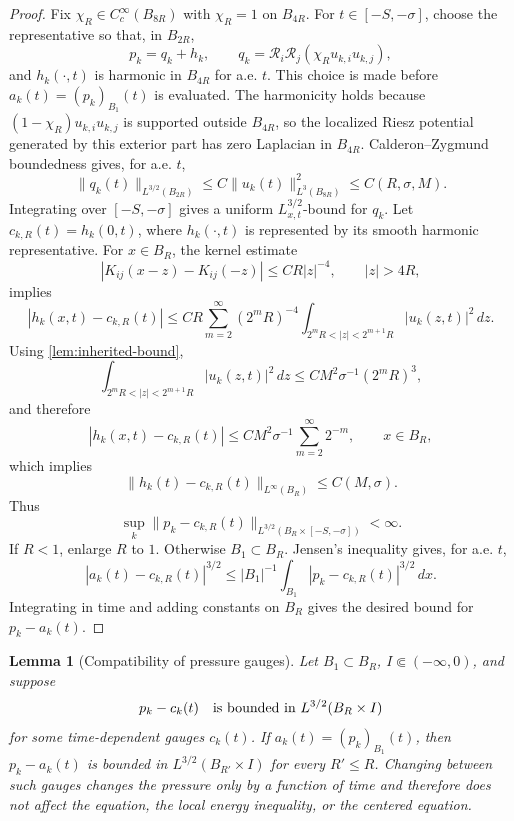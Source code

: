 \documentclass[11pt]{amsart}
\theoremstyle{plain}
\newtheorem{lemma}[theorem]{Lemma}
\theoremstyle{definition}
\theoremstyle{remark}
\numberwithin{equation}{section}
\begin{document}
\begin{proof}
Fix \(\chi_R\in C_c^\infty(B_{8R})\) with \(\chi_R=1\) on \(B_{4R}\).  For
\(t\in[-S,-\sigma]\), choose the representative so that, in \(B_{2R}\),
\[
   p_k=q_k+h_k,\qquad
   q_k=\mathcal R_i\mathcal R_j(\chi_Ru_{k,i}u_{k,j}),
\]
and \(h_k(\cdot,t)\) is harmonic in \(B_{4R}\) for a.e. \(t\).  This choice
is made before \(a_k(t)=(p_k)_{B_1}(t)\) is evaluated.  The harmonicity holds
because \((1-\chi_R)u_{k,i}u_{k,j}\) is supported outside \(B_{4R}\), so the
localized Riesz potential generated by this exterior part has zero Laplacian
in \(B_{4R}\).  Calderon--Zygmund boundedness gives, for a.e. \(t\),
\[
   \|q_k(t)\|_{L^{3/2}(B_{2R})}
   \le C\|u_k(t)\|_{L^3(B_{8R})}^2
   \le C(R,\sigma,M).
\]
Integrating over \([-S,-\sigma]\) gives a uniform
\(L^{3/2}_{x,t}\)-bound for \(q_k\).
Let \(c_{k,R}(t)=h_k(0,t)\), where \(h_k(\cdot,t)\) is represented by its
smooth harmonic representative.  For \(x\in B_R\), the kernel estimate
\[
   |K_{ij}(x-z)-K_{ij}(-z)|\le C R|z|^{-4},\qquad |z|>4R,
\]
implies
\[
   |h_k(x,t)-c_{k,R}(t)|
   \le C R\sum_{m=2}^\infty(2^mR)^{-4}
   \int_{2^mR<|z|<2^{m+1}R}|u_k(z,t)|^2\,dz .
\]
Using \cref{lem:inherited-bound},
\[
   \int_{2^mR<|z|<2^{m+1}R}|u_k(z,t)|^2\,dz
   \le C M^2\sigma^{-1}(2^mR)^3,
\]
and therefore
\[
   |h_k(x,t)-c_{k,R}(t)|
   \le C M^2\sigma^{-1}\sum_{m=2}^{\infty}2^{-m},
   \qquad x\in B_R,
\]
which implies
\[
   \|h_k(t)-c_{k,R}(t)\|_{L^\infty(B_R)}\le C(M,\sigma).
\]
Thus
\[
   \sup_k\|p_k-c_{k,R}(t)\|_{L^{3/2}(B_R\times[-S,-\sigma])}<\infty .
\]
If \(R<1\), enlarge \(R\) to \(1\).  Otherwise \(B_1\subset B_R\).  Jensen's
inequality gives, for a.e. \(t\),
\[
   |a_k(t)-c_{k,R}(t)|^{3/2}
   \le
   |B_1|^{-1}\int_{B_1}|p_k-c_{k,R}(t)|^{3/2}\,dx .
\]
Integrating in time and adding constants on \(B_R\) gives the desired bound
for \(p_k-a_k(t)\).
\end{proof}

\begin{lemma}[Compatibility of pressure gauges]\label{lem:gauge-compatibility}
Let \(B_1\subset B_R\), \(I\Subset(-\infty,0)\), and suppose
\[
   p_k-c_k(t)
   \quad\hbox{is bounded in }L^{3/2}(B_R\times I)
\]
for some time-dependent gauges \(c_k(t)\).  If
\(a_k(t)=(p_k)_{B_1}(t)\), then \(p_k-a_k(t)\) is bounded in
\(L^{3/2}(B_{R'}\times I)\) for every \(R'\le R\).  Changing between such
gauges changes the pressure only by a function of time and therefore does not
affect the equation, the local energy inequality, or the centered equation.
\end{lemma}
\end{document}
